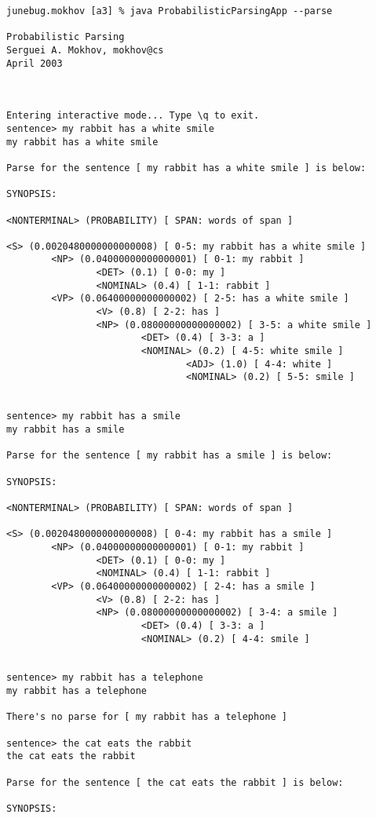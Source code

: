 \begin{verbatim}
junebug.mokhov [a3] % java ProbabilisticParsingApp --parse

Probabilistic Parsing
Serguei A. Mokhov, mokhov@cs
April 2003



Entering interactive mode... Type \q to exit.
sentence> my rabbit has a white smile
my rabbit has a white smile

Parse for the sentence [ my rabbit has a white smile ] is below:

SYNOPSIS:

<NONTERMINAL> (PROBABILITY) [ SPAN: words of span ]

<S> (0.0020480000000000008) [ 0-5: my rabbit has a white smile ]
        <NP> (0.04000000000000001) [ 0-1: my rabbit ]
                <DET> (0.1) [ 0-0: my ]
                <NOMINAL> (0.4) [ 1-1: rabbit ]
        <VP> (0.06400000000000002) [ 2-5: has a white smile ]
                <V> (0.8) [ 2-2: has ]
                <NP> (0.08000000000000002) [ 3-5: a white smile ]
                        <DET> (0.4) [ 3-3: a ]
                        <NOMINAL> (0.2) [ 4-5: white smile ]
                                <ADJ> (1.0) [ 4-4: white ]
                                <NOMINAL> (0.2) [ 5-5: smile ]


sentence> my rabbit has a smile
my rabbit has a smile

Parse for the sentence [ my rabbit has a smile ] is below:

SYNOPSIS:

<NONTERMINAL> (PROBABILITY) [ SPAN: words of span ]

<S> (0.0020480000000000008) [ 0-4: my rabbit has a smile ]
        <NP> (0.04000000000000001) [ 0-1: my rabbit ]
                <DET> (0.1) [ 0-0: my ]
                <NOMINAL> (0.4) [ 1-1: rabbit ]
        <VP> (0.06400000000000002) [ 2-4: has a smile ]
                <V> (0.8) [ 2-2: has ]
                <NP> (0.08000000000000002) [ 3-4: a smile ]
                        <DET> (0.4) [ 3-3: a ]
                        <NOMINAL> (0.2) [ 4-4: smile ]


sentence> my rabbit has a telephone
my rabbit has a telephone

There's no parse for [ my rabbit has a telephone ]

sentence> the cat eats the rabbit
the cat eats the rabbit

Parse for the sentence [ the cat eats the rabbit ] is below:

SYNOPSIS:


\end{verbatim}
